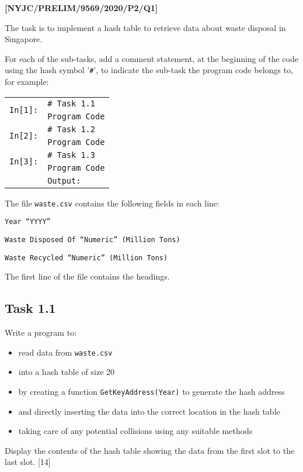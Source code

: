 \item \textbf{{[}NYJC/PRELIM/9569/2020/P2/Q1{]} }

The task is to implement a hash table to retrieve data about waste
disposal in Singapore. 

For each of the sub-tasks, add a comment statement, at the beginning
of the code using the hash symbol '\texttt{\#}', to indicate the sub-task
the program code belongs to, for example:
\noindent \begin{center}
\begin{tabular}{c|l|}
\cline{2-2} 
\multirow{2}{*}{\texttt{In{[}1{]}:}} & \texttt{\# Task 1.1}\tabularnewline
 & \texttt{Program Code}\tabularnewline
\cline{2-2} 
\multirow{2}{*}{\texttt{In{[}2{]}:}} & \texttt{\# Task 1.2}\tabularnewline
 & \texttt{Program Code}\tabularnewline
\cline{2-2} 
\multirow{2}{*}{\texttt{In{[}3{]}:}} & \texttt{\# Task 1.3}\tabularnewline
 & \texttt{Program Code}\tabularnewline
\cline{2-2} 
\multicolumn{1}{c}{} & \multicolumn{1}{l}{\texttt{Output:}}\tabularnewline
\end{tabular}
\par\end{center}

The file \texttt{waste.csv} contains the following fields in each
line: 

\texttt{Year \textendash{} \textquotedblleft YYYY\textquotedblright{} }

\texttt{Waste Disposed Of \textendash{} \textquotedblleft Numeric\textquotedblright{}
(Million Tons) }

\texttt{Waste Recycled \textendash{} \textquotedblleft Numeric\textquotedblright{}
(Million Tons) }

The first line of the file contains the headings. 

\subsection*{Task 1.1 }

Write a program to: 
\begin{itemize}
\item read data from \texttt{waste.csv} 
\item into a hash table of size 20 
\item by creating a function \texttt{GetKeyAddress(Year)} to generate the
hash address 
\item and directly inserting the data into the correct location in the hash
table 
\item taking care of any potential collisions using any suitable methods 
\end{itemize}
Display the contents of the hash table showing the data from the first
slot to the last slot. \hfill{}{[}14{]}

